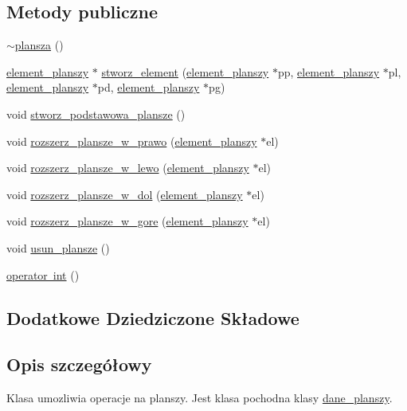 \subsection*{Metody publiczne}
\begin{DoxyCompactItemize}
\item 
\mbox{\hyperlink{classplansza_a62b15c245954e816719b92ed241db439}{$\sim$plansza}} ()
\item 
\mbox{\hyperlink{classelement__planszy}{element\+\_\+planszy}} $\ast$ \mbox{\hyperlink{classplansza_ab58b287ec128257badf582e1ce7ea11e}{stworz\+\_\+element}} (\mbox{\hyperlink{classelement__planszy}{element\+\_\+planszy}} $\ast$pp, \mbox{\hyperlink{classelement__planszy}{element\+\_\+planszy}} $\ast$pl, \mbox{\hyperlink{classelement__planszy}{element\+\_\+planszy}} $\ast$pd, \mbox{\hyperlink{classelement__planszy}{element\+\_\+planszy}} $\ast$pg)
\item 
void \mbox{\hyperlink{classplansza_a560279ec20a1cd126141f27f5f177a2c}{stworz\+\_\+podstawowa\+\_\+plansze}} ()
\item 
void \mbox{\hyperlink{classplansza_a50024fced2d5f43220cee76e77e54882}{rozszerz\+\_\+plansze\+\_\+w\+\_\+prawo}} (\mbox{\hyperlink{classelement__planszy}{element\+\_\+planszy}} $\ast$el)
\item 
void \mbox{\hyperlink{classplansza_aed692a9ce528a20a6e431d84cdb58f6b}{rozszerz\+\_\+plansze\+\_\+w\+\_\+lewo}} (\mbox{\hyperlink{classelement__planszy}{element\+\_\+planszy}} $\ast$el)
\item 
void \mbox{\hyperlink{classplansza_a6b7712b23870fbe508d00e68a740e853}{rozszerz\+\_\+plansze\+\_\+w\+\_\+dol}} (\mbox{\hyperlink{classelement__planszy}{element\+\_\+planszy}} $\ast$el)
\item 
void \mbox{\hyperlink{classplansza_a47bf5f6dea6fad229b9c525638077df8}{rozszerz\+\_\+plansze\+\_\+w\+\_\+gore}} (\mbox{\hyperlink{classelement__planszy}{element\+\_\+planszy}} $\ast$el)
\item 
void \mbox{\hyperlink{classplansza_afbbb011300c83927a042e5d2c0a6820d}{usun\+\_\+plansze}} ()
\item 
\mbox{\hyperlink{classplansza_a0400f244095fd65517b118194f6c5d9c}{operator int}} ()
\end{DoxyCompactItemize}
\subsection*{Dodatkowe Dziedziczone Składowe}


\subsection{Opis szczegółowy}
Klasa umozliwia operacje na planszy. Jest klasa pochodna klasy \mbox{\hyperlink{classdane__planszy}{dane\+\_\+planszy}}.

